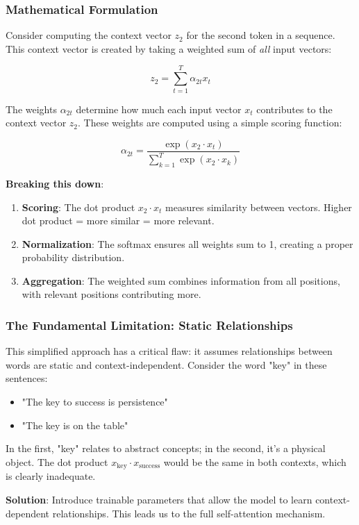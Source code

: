 \subsubsection{Mathematical Formulation}

Consider computing the context vector $z_2$ for the second token in a sequence. This context vector is created by taking a weighted sum of \textit{all} input vectors:

\[
  z_2 = \sum_{t=1}^{T} \alpha_{2t} x_t
\]

The weights $\alpha_{2t}$ determine how much each input vector $x_t$ contributes to the context vector $z_2$. These weights are computed using a simple scoring function:

\[
  \alpha_{2t} = \frac{\exp(x_2 \cdot x_t)}{\sum_{k=1}^{T} \exp(x_2 \cdot x_k)}
\]

\textbf{Breaking this down}:
\begin{enumerate}
  \item \textbf{Scoring}: The dot product $x_2 \cdot x_t$ measures similarity between vectors. Higher dot product = more similar = more relevant.
  \item \textbf{Normalization}: The softmax ensures all weights sum to 1, creating a proper probability distribution.
  \item \textbf{Aggregation}: The weighted sum combines information from all positions, with relevant positions contributing more.
\end{enumerate}

\subsubsection{The Fundamental Limitation: Static Relationships}

This simplified approach has a critical flaw: it assumes relationships between words are static and context-independent. Consider the word "key" in these sentences:
\begin{itemize}
  \item "The key to success is persistence"
  \item "The key is on the table"
\end{itemize}

In the first, "key" relates to abstract concepts; in the second, it's a physical object. The dot product $x_{\text{key}} \cdot x_{\text{success}}$ would be the same in both contexts, which is clearly inadequate.

\textbf{Solution}: Introduce trainable parameters that allow the model to learn context-dependent relationships. This leads us to the full self-attention mechanism.

